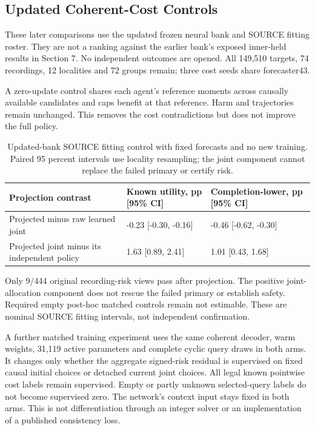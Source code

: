 \documentclass[10pt,twocolumn,letterpaper]{article}
\begin{document}
\subsection{Updated Coherent-Cost Controls}
These later comparisons use the updated frozen neural bank and SOURCE fitting roster. They are not a ranking against the earlier bank's exposed inner-held results in Section 7. No independent outcomes are opened. All 149,510 targets, 74 recordings, 12 localities and 72 groups remain; three cost seeds share forecaster43.

A zero-update control shares each agent's reference moments across causally available candidates and caps benefit at that reference. Harm and trajectories remain unchanged. This removes the cost contradictions but does not improve the full policy.

\begin{table}[!t]
\centering\small
\begin{tabularx}{\textwidth}{@{}XXX@{}}\toprule
Projection contrast & Known utility, pp [95\% CI] & Completion-lower, pp [95\% CI] \\
\midrule
Projected minus raw learned joint & -0.23 [-0.30, -0.16] & -0.46 [-0.62, -0.30] \\
Projected joint minus its independent policy & 1.63 [0.89, 2.41] & 1.01 [0.43, 1.68] \\
\bottomrule
\end{tabularx}
\caption{Updated-bank SOURCE fitting control with fixed forecasts and no new training. Paired 95 percent intervals use locality resampling; the joint component cannot replace the failed primary or certify risk.}
\end{table}
Only 9/444 original recording-risk views pass after projection. The positive joint-allocation component does not rescue the failed primary or establish safety. Required empty post-hoc matched controls remain not estimable. These are nominal SOURCE fitting intervals, not independent confirmation.

A further matched training experiment uses the same coherent decoder, warm weights, 31,119 active parameters and complete cyclic query draws in both arms. It changes only whether the aggregate signed-risk residual is supervised on fixed causal initial choices or detached current joint choices. All legal known pointwise cost labels remain supervised. Empty or partly unknown selected-query labels do not become supervised zero. The network's context input stays fixed in both arms. This is not differentiation through an integer solver or an implementation of a published consistency loss.
\end{document}
